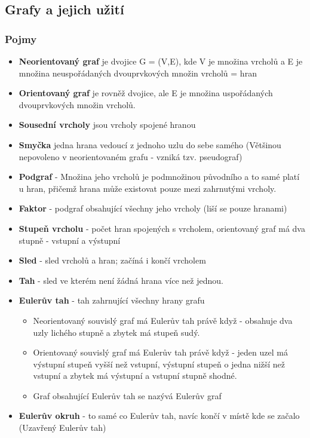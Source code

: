 \documentclass[10pt,a4paper]{article}
\begin{document}
\subsection{Grafy a jejich užití}
\subsubsection{Pojmy}
\begin{itemize}
\item \textbf{Neorientovaný graf} je dvojice G = (V,E), kde V je množina vrcholů a E je množina neuspořádaných dvouprvkových množin vrcholů = hran
\item \textbf{Orientovaný graf} je rovněž dvojice, ale E je množina uspořádaných dvouprvkových množin vrcholů.
\item \textbf{Sousední vrcholy} jsou vrcholy spojené hranou
\item \textbf{Smyčka} jedna hrana vedoucí z jednoho uzlu do sebe samého (Většinou nepovoleno v neorientovaném grafu - vzniká tzv. pseudograf)
\item \textbf{Podgraf} - Množina jeho vrcholů je podmnožinou původního a to samé platí u hran, přičemž hrana může existovat pouze mezi zahrnutými vrcholy.
\item \textbf{Faktor} - podgraf obsahující všechny jeho vrcholy (liší se pouze hranami)
\item \textbf{Stupeň vrcholu} - počet hran spojených s vrcholem, orientovaný graf má dva stupně - vstupní a výstupní
\item \textbf{Sled} - sled vrcholů a hran; začíná i končí vrcholem
\item \textbf{Tah} - sled ve kterém není žádná hrana více než jednou.
\item \textbf{Eulerův tah} - tah zahrnující všechny hrany grafu
\begin{itemize}
\item Neorientovaný souvislý graf má Eulerův tah právě když - obsahuje dva uzly lichého stupně a zbytek má stupeň sudý.
\item Orientovaný souvislý graf má Eulerův tah právě když - jeden uzel má výstupní stupeň vyšší než vstupní, výstupní stupeň o jedna nižší než vstupní a zbytek má výstupní a vstupní stupně shodné.
\item Graf obsahující Eulerův tah se nazývá Eulerův graf
\end{itemize}
\item \textbf{Eulerův okruh} - to samé co Eulerův tah, navíc končí v místě kde se začalo (Uzavřený Eulerův tah)

\end{itemize}
\end{document}
